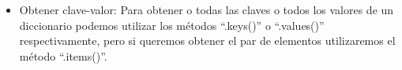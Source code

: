 \begin{itemize}
    \item  Obtener clave-valor: Para obtener o todas las claves o todos los valores de un diccionario podemos utilizar los métodos ``.keys()'' o ``.values()'' respectivamente, pero si queremos obtener el par de elementos utilizaremos el método ``.items()''.
    \newpage
    \begin{figure}[h]
        \centering
      \end{figure}

\end{itemize}